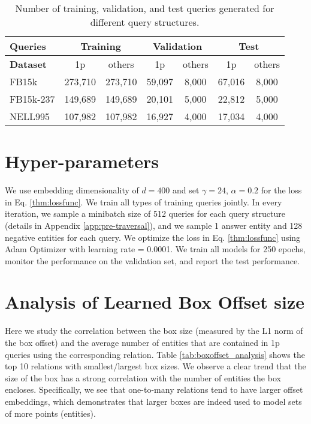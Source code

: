 \begin{table*}[t]
\centering
\small
\begin{tabular}{|l|c|c|c|c|c|c|}
\hline
         \textbf{Queries} & \multicolumn{2}{c|}{\textbf{Training}} & \multicolumn{2}{c|}{\textbf{Validation}} & \multicolumn{2}{c|}{\textbf{Test}} \\ \hline
\textbf{Dataset}     & 1p               & others           & 1p              & others          & 1p               & others          \\ \hline
FB15k     & 273,710          & 273,710          & 59,097          & 8,000           & 67,016           & 8,000           \\ \hline
FB15k-237 & 149,689          & 149,689          & 20,101          & 5,000           & 22,812           & 5,000           \\ \hline
NELL995     & 107,982          & 107,982          & 16,927          & 4,000           & 17,034           & 4,000           \\ \hline
\end{tabular}
\caption{Number of training, validation, and test queries generated for different query structures.}
\label{tab:meta_query}
\end{table*}

\section{Hyper-parameters} \label{app:expdetails}
We use embedding dimensionality of $d=400$ and set $\gamma=24$, $\alpha=0.2$ for the loss in Eq. \ref{thm:lossfunc}. We train all types of training queries jointly. In every iteration, we sample a minibatch size of 512 queries for each query structure (details in Appendix \ref{app:pre-traversal}), and we sample 1 answer entity and 128 negative entities for each query. We optimize the loss in Eq. \ref{thm:lossfunc} using Adam Optimizer \citep{kingma2014adam} with learning rate = 0.0001. We train all models for 250 epochs, monitor the performance on the validation set, and report the test performance.

\section{Analysis of Learned Box Offset size}\label{app:offset_analysis}
Here we study the correlation between the box size (measured by the L1 norm of the box offset) and the average number of entities that are contained in 1p queries using the corresponding relation. Table \ref{tab:boxoffset_analysis} shows the top 10 relations with smallest/largest box sizes.
We observe a clear trend that the size of the box has a strong correlation with the number of entities the box encloses. Specifically, we see that one-to-many relations tend to have larger offset embeddings, which demonstrates that larger boxes are indeed used to model sets of more points (entities).

